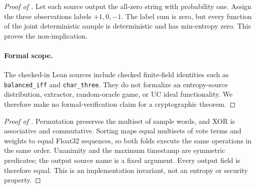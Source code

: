 \documentclass[preprint,nohyperxmp]{iacrtrans}
\begin{document}
\begin{proof}[Proof of ]
Let each source output the all-zero string with probability one. Assign the
three observations labels $+1,0,-1$. The label sum is zero, but every function
of the joint deterministic sample is deterministic and has min-entropy zero.
This proves the non-implication.

\paragraph{Formal scope.} The checked-in Lean sources include checked
finite-field identities such as
\texttt{balanced\_}\allowbreak\texttt{iff} and
\texttt{char\_three}. They do not formalize an entropy-source distribution,
extractor, random-oracle game, or UC ideal functionality. We therefore make no
formal-verification claim for a cryptographic theorem.
\end{proof}

\begin{proof}[Proof of ]
Permutation preserves the multiset of sample words, and XOR is associative and
commutative. Sorting maps equal multisets of vote terms and weights to equal
Float32 sequences, so both folds execute the same operations in the same
order. Unanimity and the maximum timestamp are symmetric predicates; the
output source name is a fixed argument. Every output field is therefore equal.
This is an implementation invariant, not an entropy or security property.
\end{proof}
\end{document}
